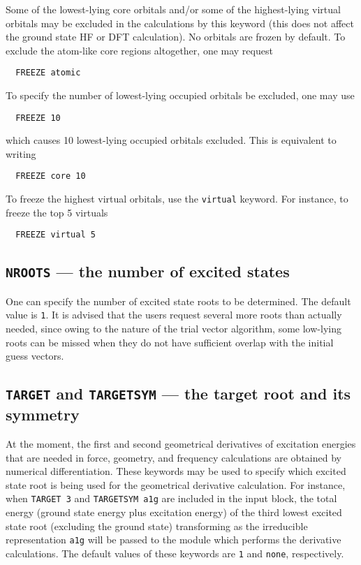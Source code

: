 Some of the lowest-lying core orbitals and/or some of the highest-lying
virtual orbitals may be excluded in the calculations
by this keyword (this does not affect the ground state HF or DFT calculation).
No orbitals are frozen by default.  To exclude the atom-like
core regions altogether, one may request
\begin{verbatim}
  FREEZE atomic
\end{verbatim}
To specify the number of lowest-lying occupied orbitals be excluded, one may use
\begin{verbatim}
  FREEZE 10
\end{verbatim}
which causes 10 lowest-lying occupied orbitals excluded.
This is equivalent to writing
\begin{verbatim}
  FREEZE core 10
\end{verbatim}
To freeze the highest virtual orbitals, use the \verb+virtual+
keyword.  For instance, to freeze the top 5 virtuals
\begin{verbatim}
  FREEZE virtual 5
\end{verbatim}

\subsection{{\tt NROOTS} --- the number of excited states}
 
One can specify the number of excited state roots to be determined.  The default
value is \verb+1+.  It is advised that the users request several more roots than actually
needed, since owing to the nature of the trial vector algorithm, some low-lying
roots can be missed when they do not have sufficient overlap with the initial guess
vectors.

\subsection{{\tt TARGET} and {\tt TARGETSYM} --- the target root and its symmetry}
 
At the moment, the first and second geometrical derivatives of excitation
energies that are needed in force, geometry, and frequency calculations are
obtained by numerical differentiation.  These keywords may be used to specify
which excited state root is being used for the geometrical derivative calculation.
For instance, when \verb+TARGET 3+ and \verb+TARGETSYM a1g+ are included in the
input block, the total energy (ground state energy plus excitation energy)
of the third lowest excited state root (excluding the ground state) transforming as
the irreducible representation \verb+a1g+ will be passed to the module which performs
the derivative calculations.  The default values of these keywords are \verb+1+ and \verb+none+,
respectively.
 
